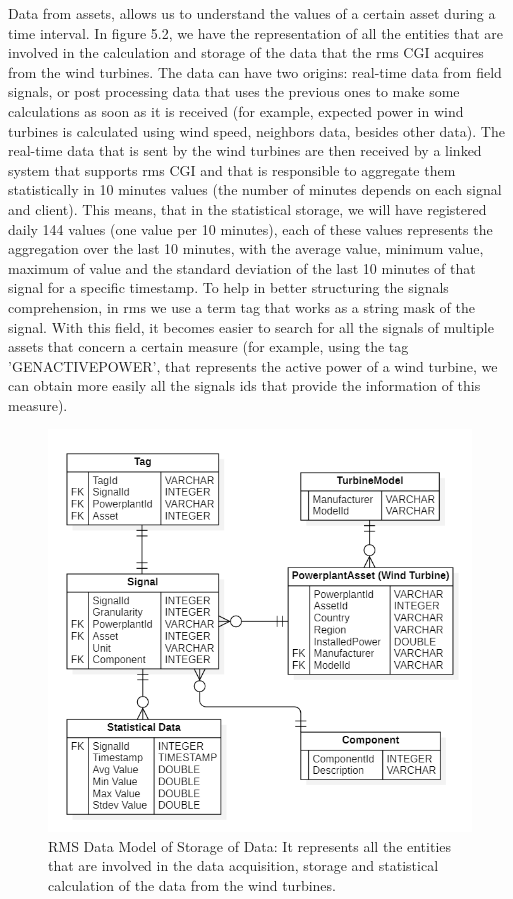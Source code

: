 Data from assets, allows us to understand the values of a certain asset during a time interval. In figure 5.2, we have the representation of all the entities that are involved in the calculation and storage of the data that the \acrshort{rms} CGI acquires from the wind turbines.
The data can have two origins: real-time data from field signals, or post processing data that uses the previous ones to make some calculations as soon as it is received (for example, expected power in wind turbines is calculated using wind speed, neighbors data, besides other data).
The real-time data that is sent by the wind turbines are then received by a linked system that supports \acrshort{rms} CGI and that is responsible to aggregate them statistically in 10 minutes values (the number of minutes depends on each signal and client). This means, that in the statistical storage, we will have registered daily 144 values (one value per 10 minutes), each of these values represents the aggregation over the last 10 minutes, with the average value, minimum value, maximum of value and the standard deviation of the last 10 minutes of that signal for a specific timestamp.
To help in better structuring the signals comprehension, in \acrshort{rms} we use a term  tag that works as a string mask of the signal. With this field, it becomes easier to search for all the signals of multiple assets that concern a certain measure (for example, using the tag 'GENACTIVEPOWER', that represents the active power of a wind turbine, we can obtain more easily all the signals ids that provide the information of this measure).

\begin{figure}[htbp]
	\centering
	\includegraphics[scale=0.7]{Chapters/Figures/methodology_fig11.png}
	\caption{RMS Data Model of Storage of Data: It represents all the entities that are involved in the data acquisition, storage and statistical calculation of the data from the wind turbines.}
	\label{fig:Figuras_Tree_silhouettes-vectorial}
\end{figure}


